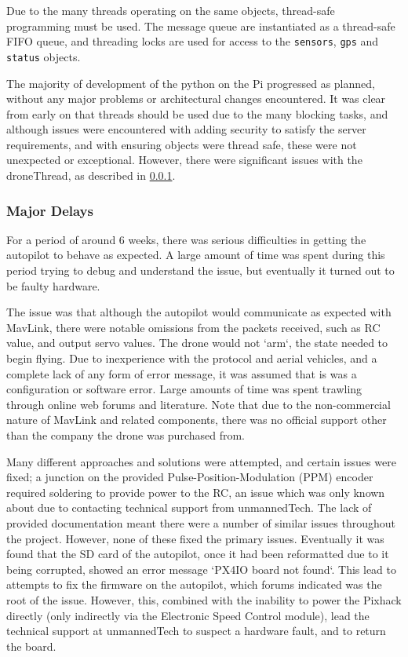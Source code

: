 \documentclass{article}
\begin{document}
Due to the many threads operating on the same objects, thread-safe programming must be used. The message queue are instantiated as a thread-safe FIFO queue, and threading locks are used for access to the \texttt{sensors}, \texttt{gps} and \texttt{status} objects.

The majority of development of the python on the Pi progressed as planned, without any major problems or architectural changes encountered. It was clear from early on that threads should be used due to the many blocking tasks, and although issues were encountered with adding security to satisfy the server requirements, and with ensuring objects were thread safe, these were not unexpected or exceptional. However, there were significant issues with the droneThread, as described in \ref{MajorDelays}.

\subsubsection{Major Delays} \label{MajorDelays}
For a period of around 6 weeks, there was serious difficulties in getting the autopilot to behave as expected. A large amount of time was spent during this period trying to debug and understand the issue, but eventually it turned out to be faulty hardware. 

The issue was that although the autopilot would communicate as expected with MavLink, there were notable omissions from the packets received, such as RC value, and output servo values. The drone would not `arm`, the state needed to begin flying. Due to inexperience with the protocol and aerial vehicles, and a complete lack of any form of error message, it was assumed that is was a configuration or software error. Large amounts of time was spent trawling through online web forums and literature. Note that due to the non-commercial nature of MavLink and related components, there was no official support other than the company the drone was purchased from. 

Many different approaches and solutions were attempted, and certain issues were fixed; a junction on the provided Pulse-Position-Modulation (PPM) encoder required soldering to provide power to the RC, an issue which was only known about due to contacting technical support from unmannedTech\cite{ppmSolder}. The lack of provided documentation meant there were a number of similar issues throughout the project. However, none of these fixed the primary issues. Eventually it was found that the SD card of the autopilot, once it had been reformatted due to it being corrupted, showed an error message `PX4IO board not found`. This lead to attempts to fix the firmware on the autopilot, which forums indicated was the root of the issue. However, this, combined with the inability to power the Pixhack directly (only indirectly via the Electronic Speed Control module), lead the technical support at unmannedTech to suspect a hardware fault, and to return the board\cite{px4ioNotFound}. 
\end{document}
